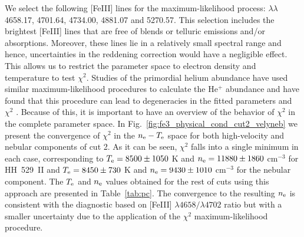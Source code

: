\documentclass[fleqn,usenatbib]{mnras}
\begin{document}
We select the following [Fe\thinspace III] lines for the maximum-likelihood process: $\lambda\lambda$4658.17, 4701.64, 4734.00, 4881.07 and 5270.57. This selection includes the brightest [Fe\thinspace III] lines that are free of blends or telluric emissions and/or absorptions.  Moreover, these lines lie in a relatively small spectral range and hence, uncertainties in the reddening correction would have a negligible effect. This allows us to restrict the parameter space to electron density and temperature to test  $\chi^2$. Studies of the primordial helium abundance have used similar maximum-likelihood procedures to calculate the He$^{+}$ abundance and have found that this procedure can lead to degeneracies in the fitted parameters and $\chi^2$  \citep[see][and references therein]{olive04,Aver11}. Because of this, it is important to have an overview of the behavior of $\chi^2$ in the complete  parameter space. In Fig.~\ref{fig:fe3_physical_cond_cut2_velyneb} we present the convergence of $\chi^2$ in the $n_{\rm e} - T_{\rm e}$ space for both high-velocity and nebular components of cut 2. As it can be seen, $\chi^2$ falls into a single minimum in each case, corresponding to $T_{\rm e}=8500 \pm 1050$ K and $n_{\rm e}=11880 \pm 1860$ $\text{cm}^{-3}$ for HH~529~II and $T_{\rm e}=8450 \pm 730$ K and $n_{\rm e}=9430 \pm 1010$ $\text{cm}^{-3}$ for the nebular component. The $T_{\rm e}$ and $n_{\rm e}$ values obtained for the rest of cuts using this approach are presented in Table~\ref{tab:pc}. The convergence to the resulting $n_{\rm e}$ is consistent with the diagnostic based on [Fe\thinspace III] $\lambda 4658/\lambda 4702$ ratio but with a smaller uncertainty due to the application of the $\chi^2$ maximum-likelihood procedure. 
\end{document}
